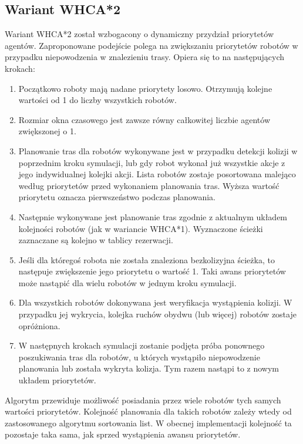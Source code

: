 
\subsection{Wariant WHCA*2}
Wariant WHCA*2 został wzbogacony o dynamiczny przydział priorytetów agentów.
Zaproponowane podejście polega na zwiększaniu priorytetów robotów w przypadku niepowodzenia w znalezieniu trasy.
Opiera się to na następujących krokach:
\begin{enumerate}
	\item Początkowo roboty mają nadane priorytety losowo. Otrzymują kolejne wartości od 1 do liczby wszystkich robotów.
	\item Rozmiar okna czasowego jest zawsze równy całkowitej liczbie agentów zwiększonej o 1.
	\item Planowanie tras dla robotów wykonywane jest w przypadku detekcji kolizji w poprzednim kroku symulacji, lub gdy robot wykonał już wszystkie akcje z jego indywidualnej kolejki akcji.
	Lista robotów zostaje posortowana malejąco według priorytetów przed wykonaniem planowania tras. Wyższa wartość priorytetu oznacza pierwszeństwo podczas planowania.
	\item Następnie wykonywane jest planowanie tras zgodnie z aktualnym układem kolejności robotów (jak w wariancie WHCA*1). Wyznaczone ścieżki zaznaczane są kolejno w tablicy rezerwacji.
	\item Jeśli dla któregoś robota nie została znaleziona bezkolizyjna ścieżka, to następuje zwiększenie jego priorytetu o wartość 1. Taki awans priorytetów może nastąpić dla wielu robotów w jednym kroku symulacji.
	\item Dla wszystkich robotów dokonywana jest weryfikacja wystąpienia kolizji. W przypadku jej wykrycia, kolejka ruchów obydwu (lub więcej) robotów zostaje opróżniona.
	\item W następnych krokach symulacji zostanie podjęta próba ponownego poszukiwania tras dla robotów, u których wystąpiło niepowodzenie planowania lub została wykryta kolizja. Tym razem nastąpi to z nowym układem priorytetów.
\end{enumerate}

Algorytm przewiduje możliwość posiadania przez wiele robotów tych samych wartości priorytetów.
Kolejność planowania dla takich robotów zależy wtedy od zastosowanego algorytmu sortowania list. W obecnej implementacji kolejność ta pozostaje taka sama, jak sprzed wystąpienia awansu priorytetów.

